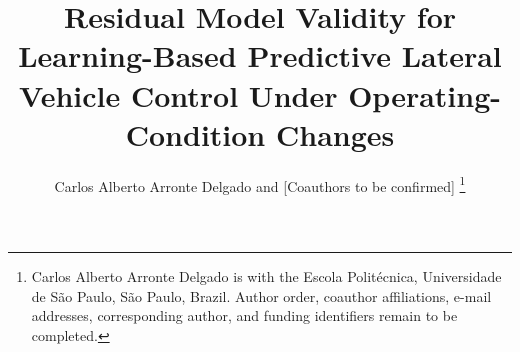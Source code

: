\documentclass[10pt,journal]{IEEEtran}
\begin{document}

\title{Residual Model Validity for Learning-Based Predictive Lateral Vehicle Control Under Operating-Condition Changes}


\author{Carlos Alberto Arronte Delgado and [Coauthors to be confirmed]%
\thanks{Carlos Alberto Arronte Delgado is with the Escola Polit\'ecnica,
Universidade de S\~ao Paulo, S\~ao Paulo, Brazil.
Author order, coauthor affiliations, e-mail addresses, corresponding author,
and funding identifiers remain to be completed.}}


\maketitle
\end{document}
